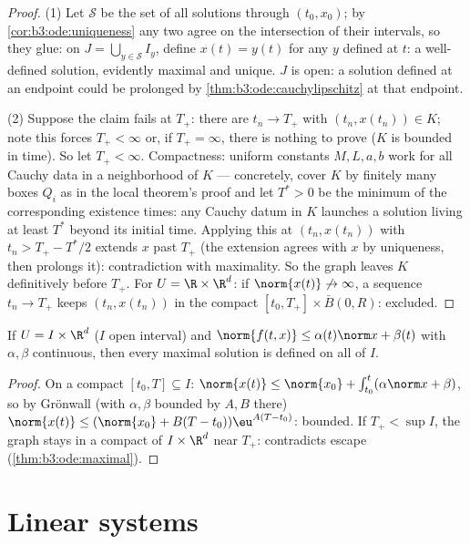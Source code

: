 \begin{proof}
(1) Let $\mathcal S$ be the set of all solutions through
$(t_0, x_0)$; by \cref{cor:b3:ode:uniqueness} any two agree on
the intersection of their intervals, so they glue: on $J =
\bigcup_{y \in \mathcal S}I_y$, define $x(t) = y(t)$ for any
$y$ defined at $t$: a well-defined solution, evidently
maximal and unique. $J$ is open: a solution defined at an
endpoint could be prolonged by
\cref{thm:b3:ode:cauchylipschitz} at that endpoint.

(2) Suppose the claim fails at $T_+$: there are $t_n \to
T_+$ with $(t_n, x(t_n)) \in K$; note this forces $T_+ <
\infty$ or, if $T_+ = \infty$, there is nothing to prove ($K$
is bounded in time). So let $T_+ < \infty$. Compactness: uniform constants $M, L, a,
b$ work for all Cauchy data in a neighborhood of $K$
--- concretely, cover $K$ by finitely many boxes $Q_i$ as in
the local theorem's proof and let $T^* > 0$ be the minimum of
the corresponding existence times: any Cauchy datum in $K$
launches a solution living at least $T^*$ beyond its initial
time. Applying this at $(t_n, x(t_n))$ with $t_n > T_+ -
T^*/2$ extends $x$ past $T_+$ (the extension agrees with $x$
by uniqueness, then prolongs it): contradiction with
maximality. So the graph leaves $K$ definitively before
$T_+$. For $U = \R\times\R^d$: if $\norm{x(t)}\not\to\infty$,
a sequence $t_n \to T_+$ keeps $(t_n, x(t_n))$ in the compact
$[t_0, T_+]\times\bar B(0, R)$: excluded.
\end{proof}

\begin{corollary}
\label{cor:b3:ode:globallinear}
If $U = I\times\R^d$ ($I$ open interval) and $\norm{f(t, x)}
\leq \alpha(t)\norm x + \beta(t)$ with $\alpha, \beta$
continuous, then every maximal solution is defined on all of
$I$.
\end{corollary}

\begin{proof}
On a compact $[t_0, T] \subseteq I$: $\norm{x(t)} \leq
\norm{x_0} + \int_{t_0}^t(\alpha\norm x + \beta)$, so by
Gr\"onwall (with $\alpha, \beta$ bounded by $A, B$ there)
$\norm{x(t)} \leq (\norm{x_0} + B(T - t_0))\eu^{A(T - t_0)}$:
bounded. If $T_+ < \sup I$, the graph stays in a compact of
$I\times\R^d$ near $T_+$: contradicts escape
(\cref{thm:b3:ode:maximal}).
\end{proof}

\section{Linear systems}

